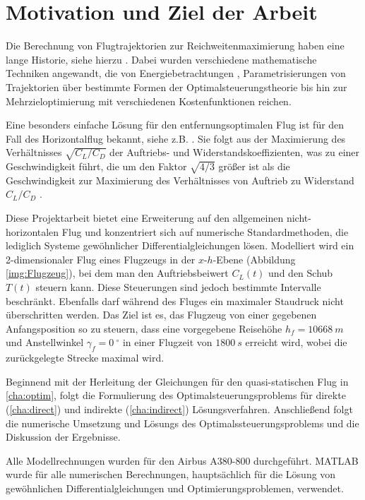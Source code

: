 \chapter{Motivation und Ziel der Arbeit}
Die Berechnung von Flugtrajektorien zur Reichweitenmaximierung haben eine lange Historie, siehe hierzu \cite{Burrows1982, Murrieta2016, Schaback2017, Pierson1989}.  Dabei wurden verschiedene mathematische Techniken angewandt, die von Energiebetrachtungen \cite{Calise1977}, Parametrisierungen von Trajektorien \cite{Burrows1982} über bestimmte Formen der Optimalsteuerungstheorie \cite{Javier2016} bis hin zur Mehrzieloptimierung mit verschiedenen Kostenfunktionen \cite{Gardi2016} reichen. 

Eine besonders einfache Lösung für den entfernungsoptimalen Flug ist für den Fall des Horizontalflug bekannt, siehe z.B. \cite{Peckham1974}. Sie folgt aus der Maximierung des Verhältnisses $\sqrt{C_{L}/C_{D}}$ der Auftriebs- und Widerstandskoeffizienten, was zu einer Geschwindigkeit führt, die um den Faktor $\sqrt{4/3}$ größer ist als die Geschwindigkeit zur Maximierung des Verhältnisses von Auftrieb zu Widerstand $C_{L}/C_{D}$ \cite{Schaback2017}.  

Diese Projektarbeit bietet eine Erweiterung auf den allgemeinen nicht-horizontalen Flug und konzentriert sich auf numerische Standardmethoden, die lediglich Systeme gewöhnlicher Differentialgleichungen lösen. Modelliert wird ein 2-dimensionaler Flug eines Flugzeugs in der $x$-$h$-Ebene (Abbildung \ref{img:Flugzeug}), bei dem man den Auftriebsbeiwert $C_L(t)$ und den Schub $T(t)$ steuern kann. Diese Steuerungen sind jedoch bestimmte Intervalle beschränkt. Ebenfalls darf während des Fluges ein maximaler Staudruck nicht überschritten werden. Das Ziel ist es, das Flugzeug von einer gegebenen Anfangsposition so zu steuern, dass eine vorgegebene Reisehöhe $h_f = 10668\ m$ und Anstellwinkel $\gamma_f = 0\ ^{\circ}$ in einer Flugzeit von $1800 \ s$ erreicht  wird, wobei die zurückgelegte Strecke maximal wird.


Beginnend mit der Herleitung der Gleichungen für den quasi-statischen Flug in \autoref{cha:optim}, folgt die Formulierung des Optimalsteuerungsproblems für direkte (\autoref{cha:direct}) und indirekte (\autoref{cha:indirect}) Lösungsverfahren. Anschließend folgt die numerische Umsetzung und Lösungs des Optimalssteuerungsproblems und die Diskussion der Ergebnisse.

Alle Modellrechnungen wurden für den Airbus A380-800 \cite{A380Tech} durchgeführt. MATLAB wurde für alle numerischen Berechnungen, hauptsächlich für die Lösung von gewöhnlichen Differentialgleichungen und Optimierungsproblemen, verwendet.


